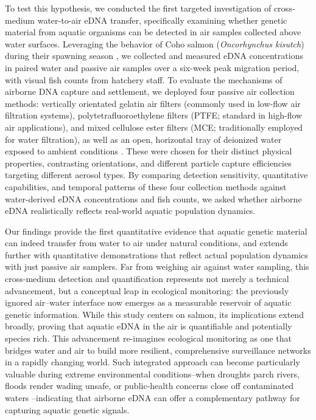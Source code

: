\documentclass{article}
\begin{document}
To test this hypothesis, we conducted the first targeted investigation of cross-medium water-to-air eDNA transfer, specifically examining whether genetic material from aquatic organisms can be detected in air samples collected above water surfaces. Leveraging the behavior of Coho salmon (\textit{Oncorhynchus kisutch}) during their spawning season \cite{mueller2008}, we collected and measured eDNA concentrations in paired water and passive air samples over a six-week peak migration period, with visual fish counts from hatchery staff. To evaluate the mechanisms of airborne DNA capture and settlement, we deployed four passive air collection methods: vertically orientated gelatin air filters (commonly used in low-flow air filtration systems), polytetrafluoroethylene filters (PTFE; standard in high-flow air applications), and mixed cellulose ester filters (MCE; traditionally employed for water filtration), as well as an open, horizontal tray of deionized water exposed to ambient conditions \cite{klepke2022}. These were chosen for their distinct physical properties, contrasting orientations, and different particle capture efficiencies targeting different aerosol types. By comparing detection sensitivity, quantitative capabilities, and temporal patterns of these four collection methods against water-derived eDNA concentrations and fish counts, we asked whether airborne eDNA realistically reflects real-world aquatic population dynamics.

Our findings provide the first quantitative evidence that aquatic genetic material can indeed transfer from water to air under natural conditions, and extends further with quantitative demonstrations that reflect actual population dynamics with just passive air samplers. Far from weighing air against water sampling, this cross-medium detection and quantification represents not merely a technical advancement, but a conceptual leap in ecological monitoring: the previously ignored air–water interface now emerges as a measurable reservoir of aquatic genetic information. While this study centers on salmon, its implications extend broadly, proving that aquatic eDNA in the air is quantifiable and potentially species rich. This advancement re-imagines ecological monitoring as one that bridges water and air to build more resilient, comprehensive surveillance networks in a rapidly changing world. Such integrated approach can become particularly valuable during extreme environmental conditions--when droughts parch rivers, floods render wading unsafe, or public-health concerns close off contaminated waters \cite{chen2024, ruiz-ramos2023, wan2023}--indicating that airborne eDNA can offer a complementary pathway for capturing aquatic genetic signals.
\end{document}
